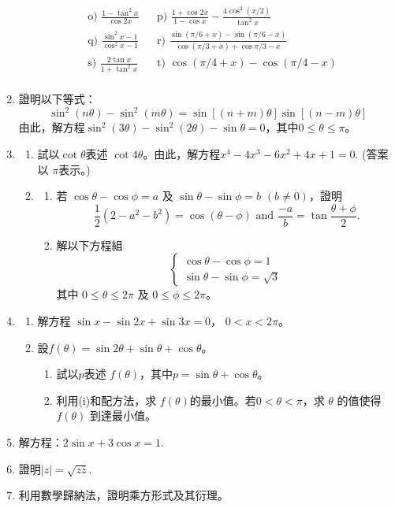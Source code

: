 \documentclass[12pt]{article}
\begin{document}
\begin{enumerate}
\begin{align*}
            &\textrm{o) } \frac{1-\tan^2{x}}{\cos{2x}} && \textrm{p) } \frac{1+\cos{2x}}{1-\cos{x}}-\frac{4\cos^2{(x/2)}}{\tan^2{x}}\\
            &\textrm{q) } \frac{\sin^2{x}-1}{\cos^2{x}-1} && \textrm{r) } \frac{\sin(\pi/6+x)-\sin(\pi/6-x)}{\cos(\pi/3+x)+\cos{\pi/3-x}}\\
            &\textrm{s) } \frac{2\tan{x}}{1+\tan^2{x}} && \textrm{t) } \cos(\pi/4+x)-\cos(\pi/4-x)\\
        \end{align*}
        \item 證明以下等式：$$\sin^2(n\theta)-\sin^2(m\theta)=\sin[(n+m)\theta]\sin[(n-m)\theta]$$由此，解方程$\sin^2(3\theta)-\sin^2(2\theta)-\sin{\theta}=0$，其中$0\leq \theta\leq \pi$。
        \item \begin{enumerate}
            \item 試以$\cot{\theta}$表述 $\cot{4\theta}$。由此，解方程$x^4-4x^3-6x^2+4x+1=0$. (答案以 $\pi$表示。)
            \item \begin{enumerate}
                \item 若 $\cos{\theta}-\cos{\phi}=a$ 及 $\sin{\theta}-\sin{\phi}=b$ $(b\neq 0)$，證明 $$\frac{1}{2}(2-a^2-b^2)=\cos{(\theta-\phi)}\textrm{ and }\frac{-a}{b}=\tan{\frac{\theta+\phi}{2}}.$$
                \item 解以下方程組 $$\begin{cases}
                    \cos{\theta}-\cos{\phi}=1\\
                    \sin{\theta}-\sin{\phi}=\sqrt{3}
                \end{cases}$$
                其中 $0\leq \theta \leq 2\pi$ 及 $0\leq \phi \leq 2\pi$。
            \end{enumerate}
        \end{enumerate}
        \item \begin{enumerate}
            \item 解方程 $\sin{x}-\sin{2x}+\sin{3x}=0$， $0<x<2\pi$。
            \item 設$f(\theta)=\sin{2\theta}+\sin{\theta}+\cos{\theta}$。\begin{enumerate}
                \item 試以$p$表述 $f(\theta)$，其中$p=\sin{\theta}+\cos{\theta}$。
                \item 利用(i)和配方法，求 $f(\theta)$的最小值。若$0<\theta<\pi$，求 $\theta$ 的值使得 $f(\theta)$ 到達最小值。
            \end{enumerate}
        \end{enumerate}
        \item 解方程：$2\sin{x}+3\cos{x}=1$.
        \item 證明$|z|=\sqrt{z\overline{z}}$.
        \item 利用數學歸納法，證明乘方形式及其衍理。
    \end{enumerate}
\end{document}
